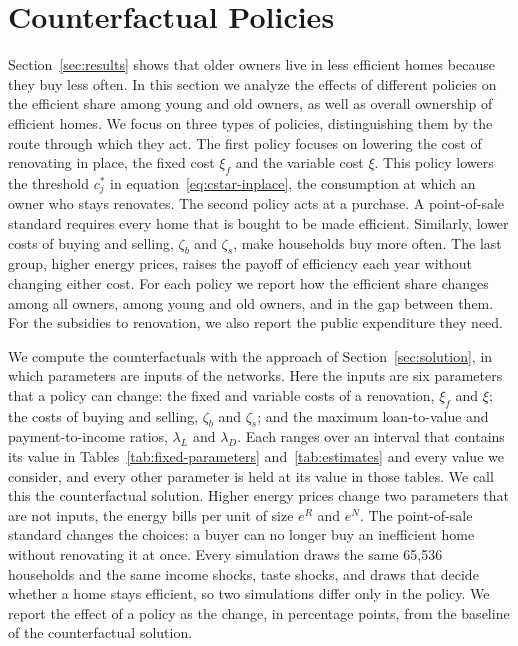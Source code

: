 \section{Counterfactual Policies}\label{sec:policy}

Section~\ref{sec:results} shows that older owners live in less efficient
homes because they buy less often. In this section we analyze the effects of
different policies on the efficient share among young and old owners, as well as overall ownership of efficient homes. We focus on three types of policies, distinguishing them by the route through which they act. The first policy focuses on lowering the cost of renovating in place, the fixed cost $\xi_f$ and the
variable cost $\xi$. This policy lowers the threshold $c_j^*$ in
equation~\eqref{eq:cstar-inplace}, the consumption at which an owner who
stays renovates. The second policy acts at a purchase. A point-of-sale
standard requires every home that is bought to be made efficient. Similarly, lower
costs of buying and selling, $\zeta_b$ and $\zeta_s$, make households buy
more often. The last group, higher energy prices, raises the payoff of
efficiency each year without changing either cost. For each policy we
report how the efficient share changes among all owners, among young and
old owners, and in the gap between them.  For the subsidies to
renovation, we also report the public expenditure they need.


We compute the counterfactuals with the approach of
Section~\ref{sec:solution}, in which parameters are inputs of the
networks. Here the inputs are six parameters that a policy can change: the
fixed and variable costs of a renovation, $\xi_f$ and $\xi$; the costs of
buying and selling, $\zeta_b$ and $\zeta_s$; and the maximum loan-to-value
and payment-to-income ratios, $\lambda_L$ and $\lambda_D$. Each ranges over
an interval that contains its value in Tables~\ref{tab:fixed-parameters}
and~\ref{tab:estimates} and every value we consider, and every other
parameter is held at its value in those tables. We call this the
counterfactual solution.  Higher energy prices change two
parameters that are not inputs, the energy bills per unit of size $e^R$
and $e^N$. The point-of-sale standard changes the choices: a buyer can no
longer buy an inefficient home without renovating it at once. Every
simulation draws the same 65,536 households and the same
income shocks, taste shocks, and draws that decide whether a home stays
efficient, so two simulations differ only in the policy. We report the
effect of a policy as the change, in percentage points, from the baseline
of the counterfactual solution.


